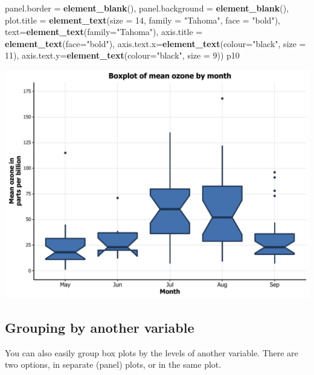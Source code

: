 \documentclass[]{article}
\newenvironment{Shaded}{\begin{snugshade}}{\end{snugshade}}
\newcommand{\KeywordTok}[1]{\textcolor[rgb]{0.13,0.29,0.53}{\textbf{{#1}}}}
\newcommand{\DataTypeTok}[1]{\textcolor[rgb]{0.13,0.29,0.53}{{#1}}}
\newcommand{\DecValTok}[1]{\textcolor[rgb]{0.00,0.00,0.81}{{#1}}}
\newcommand{\StringTok}[1]{\textcolor[rgb]{0.31,0.60,0.02}{{#1}}}
\newcommand{\NormalTok}[1]{{#1}}
\begin{document}
\begin{Shaded}
\begin{Highlighting}[]
              \DataTypeTok{panel.border =} \KeywordTok{element_blank}\NormalTok{(), }\DataTypeTok{panel.background =} \KeywordTok{element_blank}\NormalTok{(),}
              \DataTypeTok{plot.title =} \KeywordTok{element_text}\NormalTok{(}\DataTypeTok{size =} \DecValTok{14}\NormalTok{, }\DataTypeTok{family =} \StringTok{"Tahoma"}\NormalTok{, }\DataTypeTok{face =} \StringTok{"bold"}\NormalTok{),}
              \DataTypeTok{text=}\KeywordTok{element_text}\NormalTok{(}\DataTypeTok{family=}\StringTok{"Tahoma"}\NormalTok{), }
              \DataTypeTok{axis.title =} \KeywordTok{element_text}\NormalTok{(}\DataTypeTok{face=}\StringTok{"bold"}\NormalTok{),}
              \DataTypeTok{axis.text.x=}\KeywordTok{element_text}\NormalTok{(}\DataTypeTok{colour=}\StringTok{"black"}\NormalTok{, }\DataTypeTok{size =} \DecValTok{11}\NormalTok{), }
              \DataTypeTok{axis.text.y=}\KeywordTok{element_text}\NormalTok{(}\DataTypeTok{colour=}\StringTok{"black"}\NormalTok{, }\DataTypeTok{size =} \DecValTok{9}\NormalTok{)) }
\NormalTok{p10}
\end{Highlighting}
\end{Shaded}

\begin{center}\includegraphics{0_all_posts_pdf/box_15-1} \end{center}

\subsection{Grouping by another
variable}\label{grouping-by-another-variable}

You can also easily group box plots by the levels of another variable.
There are two options, in separate (panel) plots, or in the same plot.
\end{document}
